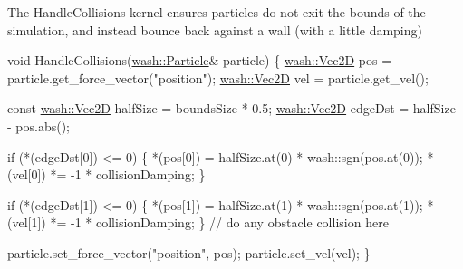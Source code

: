 The Handle\+Collisions kernel ensures particles do not exit the bounds of the simulation, and instead bounce back against a \textquotesingle{}wall\textquotesingle{} (with a little damping) 
\begin{DoxyCode}
\textcolor{keywordtype}{void} HandleCollisions(\mbox{\hyperlink{classwash_1_1Particle}{wash::Particle}}& particle) \{
    \mbox{\hyperlink{classwash_1_1Vec}{wash::Vec2D}} pos = particle.get\_force\_vector(\textcolor{stringliteral}{"position"});
    \mbox{\hyperlink{classwash_1_1Vec}{wash::Vec2D}} vel = particle.get\_vel();

    \textcolor{keyword}{const} \mbox{\hyperlink{classwash_1_1Vec}{wash::Vec2D}} halfSize = boundsSize * 0.5;
    \mbox{\hyperlink{classwash_1_1Vec}{wash::Vec2D}} edgeDst = halfSize - pos.abs();

    \textcolor{keywordflow}{if} (*(edgeDst[0]) <= 0) \{
        *(pos[0]) = halfSize.at(0) * wash::sgn(pos.at(0));
        *(vel[0]) *= -1 * collisionDamping;
    \}

    \textcolor{keywordflow}{if} (*(edgeDst[1]) <= 0) \{
        *(pos[1]) = halfSize.at(1) * wash::sgn(pos.at(1));
        *(vel[1]) *= -1 * collisionDamping;
    \}
    \textcolor{comment}{// do any obstacle collision here}

    particle.set\_force\_vector(\textcolor{stringliteral}{"position"}, pos);
    particle.set\_vel(vel);
\}
\end{DoxyCode}
 